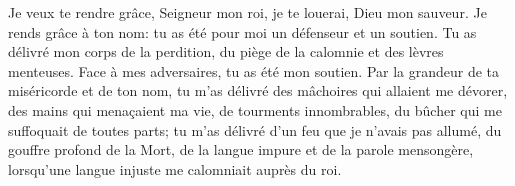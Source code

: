 Je veux te rendre grâce, Seigneur mon roi,
	je te louerai, Dieu mon sauveur.
Je rends grâce à ton nom:
	tu as été pour moi un défenseur et un soutien.
Tu as délivré mon corps de la perdition,
	du piège de la calomnie et des lèvres menteuses.
Face à mes adversaires, tu as été mon soutien.
Par la grandeur de ta miséricorde et de ton nom,
	tu m’as délivré des mâchoires qui allaient me dévorer,
	des mains qui menaçaient ma vie, de tourments innombrables,
	du bûcher qui me suffoquait de toutes parts;
	tu m’as délivré d’un feu que je n’avais pas allumé,
	du gouffre profond de la Mort,
		de la langue impure et de la parole mensongère,
	lorsqu’une langue injuste me calomniait auprès du roi.
